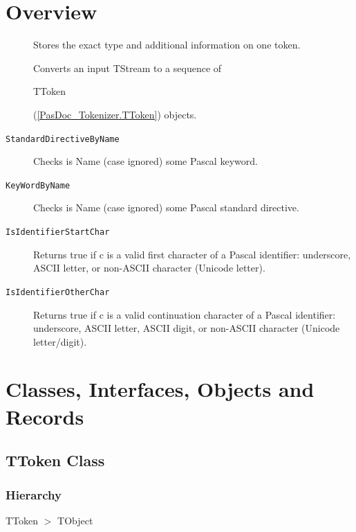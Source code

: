 \documentclass{report}
\newif\ifpdf
\begin{document}
\section{Overview}
\begin{description}
\item[\texttt{\begin{ttfamily}TToken\end{ttfamily} Class}]Stores the exact type and additional information on one token.
\item[\texttt{\begin{ttfamily}TTokenizer\end{ttfamily} Class}]Converts an input TStream to a sequence of \begin{ttfamily}TToken\end{ttfamily}(\ref{PasDoc_Tokenizer.TToken}) objects.
\end{description}
\begin{description}
\item[\texttt{StandardDirectiveByName}]Checks is Name (case ignored) some Pascal keyword.
\item[\texttt{KeyWordByName}]Checks is Name (case ignored) some Pascal standard directive.
\item[\texttt{IsIdentifierStartChar}]Returns true if c is a valid first character of a Pascal identifier: underscore, ASCII letter, or non{-}ASCII character (Unicode letter).
\item[\texttt{IsIdentifierOtherChar}]Returns true if c is a valid continuation character of a Pascal identifier: underscore, ASCII letter, ASCII digit, or non{-}ASCII character (Unicode letter/digit).
\end{description}
\section{Classes, Interfaces, Objects and Records}
\ifpdf
\subsection*{\large{\textbf{TToken Class}}\normalsize\hspace{1ex}\hrulefill}
\else
\subsection*{TToken Class}
\fi
\label{PasDoc_Tokenizer.TToken}
\subsubsection*{\large{\textbf{Hierarchy}}\normalsize\hspace{1ex}\hfill}
TToken {$>$} TObject
\end{document}
